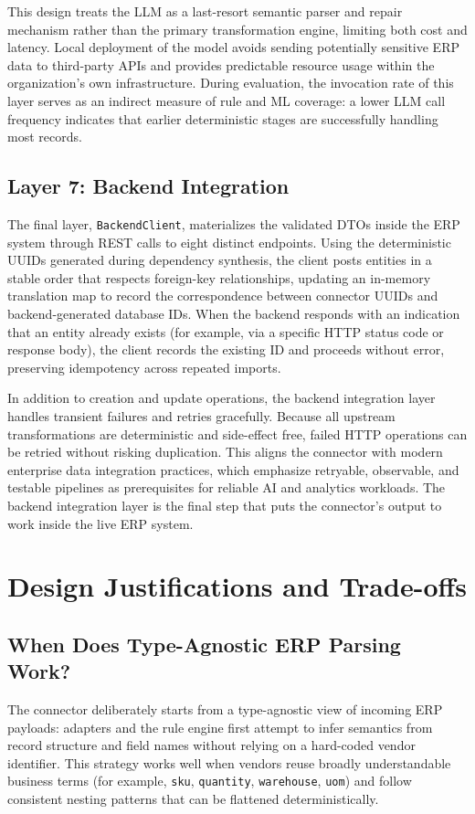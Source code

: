 \documentclass{article}
\begin{document}
This design treats the LLM as a last-resort semantic parser and repair mechanism rather than
the primary transformation engine, limiting both cost and latency.
Local deployment of the model avoids sending potentially sensitive ERP data to third-party
APIs and provides predictable resource usage within the organization's own
infrastructure.\autocite{daily2026ollama}
During evaluation, the invocation rate of this layer serves as an indirect measure of rule and
ML coverage: a lower LLM call frequency indicates that earlier deterministic stages are
successfully handling most records.

\subsection{Layer 7: Backend Integration}
The final layer, \texttt{BackendClient}, materializes the validated DTOs inside the ERP system
through REST calls to eight distinct endpoints.
Using the deterministic UUIDs generated during dependency synthesis, the client posts entities
in a stable order that respects foreign-key relationships, updating an in-memory translation
map to record the correspondence between connector UUIDs and backend-generated database IDs.
When the backend responds with an indication that an entity already exists (for example, via a
specific HTTP status code or response body), the client records the existing ID and proceeds
without error, preserving idempotency across repeated imports.\autocite{montecarlo2025pipeline}

In addition to creation and update operations, the backend integration layer handles transient
failures and retries gracefully.
Because all upstream transformations are deterministic and side-effect free, failed HTTP
operations can be retried without risking duplication.
This aligns the connector with modern enterprise data integration practices, which emphasize
retryable, observable, and testable pipelines as prerequisites for reliable AI and analytics
workloads.\autocite{samta2026engineering}
The backend integration layer is the final step that puts the connector's output to work inside the live ERP system.

\section{Design Justifications and Trade-offs}

\subsection{When Does Type-Agnostic ERP Parsing Work?}
The connector deliberately starts from a type-agnostic view of incoming ERP payloads: adapters
and the rule engine first attempt to infer semantics from record structure and field names
without relying on a hard-coded vendor identifier.\autocite{doan2012principles,substack2025schemamatching}
This strategy works well when vendors reuse broadly understandable business terms (for example,
\texttt{sku}, \texttt{quantity}, \texttt{warehouse}, \texttt{uom}) and follow consistent
nesting patterns that can be flattened deterministically.
\end{document}
